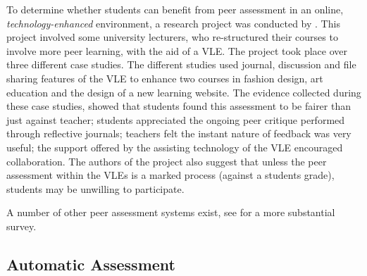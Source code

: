 \documentclass[sigplan,10pt,review]{acmart}\settopmatter{printfolios=true}
\begin{document}

To determine whether students can benefit from peer assessment in an
online, \textit{technology-enhanced} environment, a research project
was conducted by \citet{keppell_peer_2006}. This project
involved some university lecturers, who re-structured their courses to
involve more peer learning, with the aid of a \ac{VLE}.
%
The project took place over three different case studies. The
different studies used journal, discussion and file sharing features
of the \ac{VLE} to enhance two courses in fashion design, art education
and the design of a new learning website. The evidence
collected during these case studies, showed that
students found this assessment to be fairer than just against teacher;
students appreciated the ongoing peer critique performed through
reflective journals;
teachers felt the instant nature of feedback was very useful;
the support offered by the assisting technology of the \ac{VLE}
encouraged collaboration.
The authors of the project also suggest that unless the peer
assessment within the \acp{VLE} is a marked process (against a
students grade), students may be unwilling to participate.


A number of other peer assessment systems exist, see
\cite{LuxtonReilly_CSE-2009-v19n4} for a more substantial survey.


\subsection{Automatic Assessment}

\end{document}
